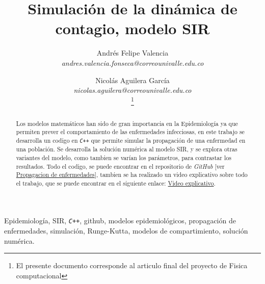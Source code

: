\documentclass[journal]{IEEEtran}
\begin{document}
\title{Simulación de la dinámica de contagio, modelo SIR}
\author{Andrés Felipe Valencia \\
	\textit{andres.valencia.fonseca@correounivalle.edu.co}\\%
	\and
	Nicolás Aguilera García \\
	\textit{nicolas.aguilera@correounivalle.edu.co}\\
	\thanks{El presente documento corresponde al articulo final del
		proyecto de Fisica computacional}} %

\maketitle

\begin{abstract}
	Los modelos matemáticos han sido de gran importancia en la Epidemiología ya que
	permiten prever el comportamiento de las enfermedades infecciosas, en este trabajo
	se desarrolla un codigo en \texttt{\textit{C++}} que permite simular la propagación
	de una enfermedad en una población. Se desarrolla la solución numérica al modelo SIR, y 
	se explora otras variantes del modelo, como tambien se varían los parámetros, para contrastar los resultados.
	Todo el codigo, se puede encontrar en el repositorio de \emph{GitHub}
	[ver \href{https://github.com/niaggar/propagacion-de-enfermedades-project}{Propagacion
	de enfermedades}], tambien se ha realizado un video explicativo sobre todo el trabajo,
	que se puede encontrar en el siguiente enlace: \href{https://drive.google.com/file/d/1-Wrr3fB-JRRgwQq_m59-RsKbWqgoxFI4/view?usp=share_link}{Video
	explicativo}.
\end{abstract}

\begin{IEEEkeywords}
Epidemiología, SIR, \texttt{\textit{C++}}, github, modelos epidemiológicos, propagación de enfermedades,
simulación, Runge-Kutta, modelos de compartimiento, solución numérica.
\end{IEEEkeywords}
\end{document}
